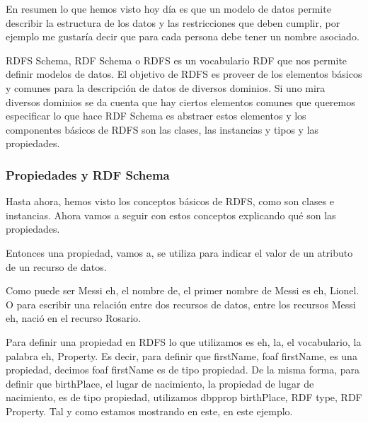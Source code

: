 En resumen lo que hemos visto hoy día es que un modelo de datos permite describir la estructura de los datos y las restricciones que deben cumplir, por ejemplo me gustaría decir que para cada persona debe tener un nombre asociado.

RDFS Schema, RDF Schema o RDFS es un vocabulario RDF que nos permite definir modelos de datos. El objetivo de RDFS es proveer de los elementos básicos y comunes para la descripción de datos de diversos dominios. Si uno mira diversos dominios se da cuenta que hay ciertos elementos comunes que queremos especificar lo que hace RDF Schema es abstraer estos elementos y los componentes básicos de RDFS son las clases, las instancias y tipos y las propiedades. 

\subsubsection{Propiedades y RDF Schema}

Hasta ahora, hemos visto los conceptos básicos de RDFS, como son clases e instancias. Ahora vamos a seguir con estos conceptos explicando qué son las propiedades.

Entonces una propiedad, vamos a, se utiliza para indicar el valor de un atributo de un recurso de datos.

Como puede ser Messi eh, el nombre de, el primer nombre de Messi es eh, Lionel. O para escribir una relación entre dos recursos de datos, entre los recursos Messi eh, nació en el recurso Rosario.

Para definir una propiedad en RDFS lo que utilizamos es eh, la, el vocabulario, la palabra eh, Property. Es decir, para definir que firstName, foaf firstName, es una propiedad, decimos foaf firstName es de tipo propiedad. De la misma forma, para definir que birthPlace, el lugar de nacimiento, la propiedad de lugar de nacimiento, es de tipo propiedad, utilizamos dbpprop birthPlace, RDF type, RDF Property. Tal y como estamos mostrando en este, en este ejemplo.

